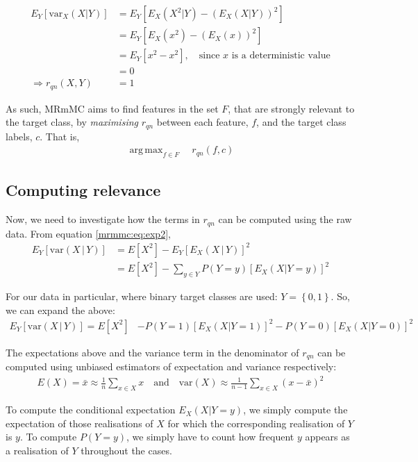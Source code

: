 \documentclass[12pt, twoside, a4paper]{report}
\def\var{\text{var}}
\DeclareMathOperator*{\argmax}{arg\,max}
\begin{document}
\begin{align*}
E_Y[\var_X(X|Y)]
&= E_Y [E_X(X^2|Y)-\left( E_X(X|Y) \right)^2 ] \\
&= E_Y \left[E_X\left(x^2\right)-\left( E_X\left(x \right) \right)^2 \right] \\
&= E_Y \left[x^2 -x^2 \right], \quad \text{since $x$ is a deterministic value} \\
&= 0 \\
\Rightarrow r_{qn} (X, Y) &= 1
\end{align*}

As such, MRmMC aims to find features in the set $F$, that are strongly relevant to the target class, by \textit{maximising} $r_{qn}$ between each feature, $f$, and the target class labels, $c$. That is,
\begin{align*}
\argmax_{f \in F} \quad r_{qn}(f, c)
\end{align*}

\subsection{Computing relevance}
Now, we need to investigate how the terms in $r_{qn}$ can be computed using the raw data. From equation \ref{mrmmc:eq:exp2},
\begin{align*}
E_Y [ \var(X \, | \, Y) ]
&= E[X^2] - E_Y [ E_X(X\,|\,Y) ] ^2 \\
&= E[X^2] - \sum_{y \in Y} P(Y=y) \left[ E_X(X|Y=y) \right]^2 
\end{align*}

For our data in particular, where binary target classes are used: $Y= \left\lbrace 0,1 \right\rbrace$. So, we can expand the above:
\begin{align*}
E_Y [ \var(X \, | \, Y) ]
= E[X^2] &- P(Y=1) \left[ E_X(X|Y=1) \right]^2 - P(Y=0) \left[ E_X(X|Y=0) \right]^2 
\end{align*}

The expectations above and the variance term in the denominator of $r_{qn}$ can be computed using unbiased estimators of expectation and variance respectively:
\begin{align*}
E(X) = \bar{x} \approx \frac{1}{n} \sum_{x \in X} x \quad \text{and} \quad \var(X) \approx \frac{1}{n-1} \sum_{x \in X} (x- \bar{x})^2
\end{align*}

To compute the conditional expectation $E_X(X|Y=y)$, we simply compute the expectation of those realisations of $X$ for which the corresponding realisation of $Y$ is $y$. To compute $P(Y=y)$, we simply have to count how frequent $y$ appears as a realisation of $Y$ throughout the cases.
\end{document}
